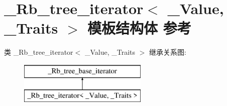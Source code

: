 \hypertarget{struct___rb__tree__iterator}{}\section{\+\_\+\+Rb\+\_\+tree\+\_\+iterator$<$ \+\_\+\+Value, \+\_\+\+Traits $>$ 模板结构体 参考}
\label{struct___rb__tree__iterator}
类 \+\_\+\+Rb\+\_\+tree\+\_\+iterator$<$ \+\_\+\+Value, \+\_\+\+Traits $>$ 继承关系图\+:\begin{figure}[H]
\begin{center}
\leavevmode
\includegraphics[height=2.000000cm]{struct___rb__tree__iterator}
\end{center}
\end{figure}
